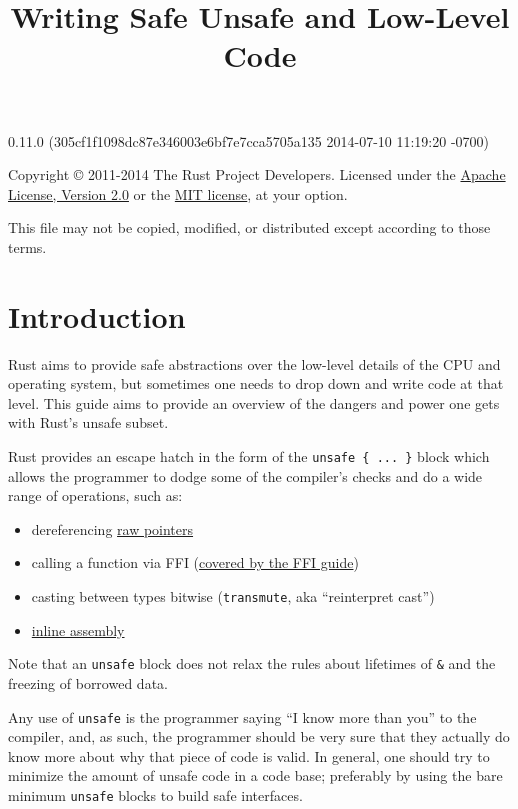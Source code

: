 \documentclass[]{article}
\title{Writing Safe Unsafe and Low-Level Code}
\begin{document}
\maketitle

0.11.0 (305cf1f1098dc87e346003e6bf7e7cca5705a135 2014-07-10 11:19:20 -0700)

Copyright © 2011-2014 The Rust Project Developers. Licensed under the
\href{http://www.apache.org/licenses/LICENSE-2.0}{Apache License,
Version 2.0} or the \href{http://opensource.org/licenses/MIT}{MIT
license}, at your option.

This file may not be copied, modified, or distributed except according
to those terms.

{
\hypersetup{linkcolor=black}
\setcounter{tocdepth}{3}
\tableofcontents
}
\section{Introduction}\label{introduction}

Rust aims to provide safe abstractions over the low-level details of the
CPU and operating system, but sometimes one needs to drop down and write
code at that level. This guide aims to provide an overview of the
dangers and power one gets with Rust's unsafe subset.

Rust provides an escape hatch in the form of the
\texttt{unsafe \{ ... \}} block which allows the programmer to dodge
some of the compiler's checks and do a wide range of operations, such
as:

\begin{itemize}
\itemsep1pt\parskip0pt
\item
  dereferencing \hyperref[raw-pointers]{raw pointers}
\item
  calling a function via FFI (\href{guide-ffi.html}{covered by the FFI
  guide})
\item
  casting between types bitwise (\texttt{transmute}, aka ``reinterpret
  cast'')
\item
  \hyperref[inline-assembly]{inline assembly}
\end{itemize}

Note that an \texttt{unsafe} block does not relax the rules about
lifetimes of \texttt{\&} and the freezing of borrowed data.

Any use of \texttt{unsafe} is the programmer saying ``I know more than
you'' to the compiler, and, as such, the programmer should be very sure
that they actually do know more about why that piece of code is valid.
In general, one should try to minimize the amount of unsafe code in a
code base; preferably by using the bare minimum \texttt{unsafe} blocks
to build safe interfaces.
\end{document}
